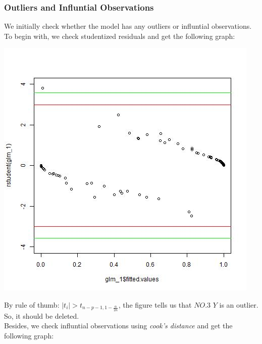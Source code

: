 \documentclass[12pt,a4paper]{article}
\begin{document}
\subsubsection{Outliers and Influntial Observations}
We initially check whether the model has any outliers or influntial observations. To begin with, we check studentized residuals and get the following graph:
\newline
\begin{center}
\includegraphics[scale = 0.6]{rstudent.jpg}
\end{center}
By rule of thumb: $\vert t_i \vert > t_{n - p - 1, 1 - \frac{\alpha}{2n}}$, the figure tells us that $NO.3$  $Y$ is an outlier. So, it should be deleted.\\
\newline
Besides, we check influntial observations using \emph{cook's distance} and get the following graph:
\newline
\end{document}
